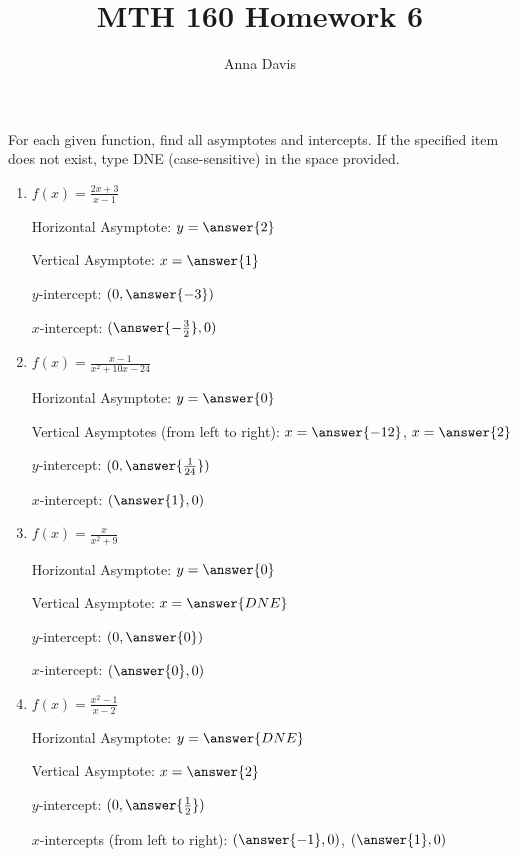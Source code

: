 \documentclass{ximera}
\author{Anna Davis} \title{MTH 160 Homework 6}
\begin{document}
\begin{abstract}

\end{abstract}
\maketitle

 
 \begin{problem}\label{prob:160hom6prob2} 
 For each given function, find all asymptotes and intercepts.   If the specified item does not exist, type DNE (case-sensitive) in the space provided.  
  \begin{enumerate}
\item
$f(x)=\frac{2x+3}{x-1}$

Horizontal Asymptote: $y=\answer{2}$

Vertical Asymptote: $x=\answer{1}$

$y$-intercept: $(0, \answer{-3})$

$x$-intercept: $(\answer{-\frac{3}{2}},0)$

\item
$f(x)=\frac{x-1}{x^2+10x-24}$

Horizontal Asymptote: $y=\answer{0}$

Vertical Asymptotes (from left to right): $x=\answer{-12}$, $x=\answer{2}$

$y$-intercept: $(0, \answer{\frac{1}{24}})$

$x$-intercept: $(\answer{1},0)$
\item
$f(x)=\frac{x}{x^2+9}$

Horizontal Asymptote: $y=\answer{0}$

Vertical Asymptote: $x=\answer{DNE}$

$y$-intercept: $(0, \answer{0})$

$x$-intercept: $(\answer{0},0)$

\item
$f(x)=\frac{x^2-1}{x-2}$

Horizontal Asymptote: $y=\answer{DNE}$

Vertical Asymptote: $x=\answer{2}$

$y$-intercept: $(0, \answer{\frac{1}{2}})$

$x$-intercepts (from left to right): $(\answer{-1},0)$, $(\answer{1},0)$
  \end{enumerate}
\end{problem}
 
 
\end{document}
